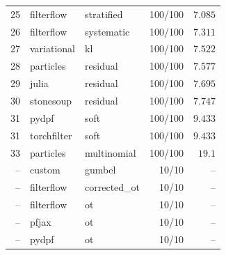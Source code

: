 \begin{table}[!htbp]
\begin{tabular}{rllrr}
25 & filterflow & stratified & 100/100 & $7.085$ \\
26 & filterflow & systematic & 100/100 & $7.311$ \\
27 & variational & kl & 100/100 & $7.522$ \\
28 & particles & residual & 100/100 & $7.577$ \\
29 & julia & residual & 100/100 & $7.695$ \\
30 & stonesoup & residual & 100/100 & $7.747$ \\
31 & pydpf & soft & 100/100 & $9.433$ \\
31 & torchfilter & soft & 100/100 & $9.433$ \\
33 & particles & multinomial & 100/100 & $19.1$ \\
-- & custom & gumbel & 10/10 & $\text{--}$ \\
-- & filterflow & corrected\_ot & 10/10 & $\text{--}$ \\
-- & filterflow & ot & 10/10 & $\text{--}$ \\
-- & pfjax & ot & 10/10 & $\text{--}$ \\
-- & pydpf & ot & 10/10 & $\text{--}$ \\
\bottomrule
\end{tabular}
\end{table}
